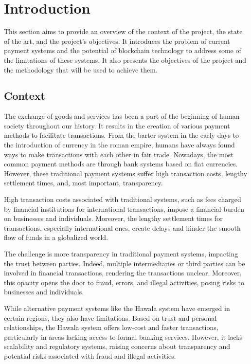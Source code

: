 \chapter{Introduction}
\label{ch:introduction}

This section aims to provide an overview of the context of the project, the state of the art, and the project's objectives. It introduces the
problem of current payment systems and the potential of blockchain technology to address some of the limitations of these systems. It also presents the
objectives of the project and the methodology that will be used to achieve them.

\minitoc



\section{Context}
\label{sec:ch1_context}

The exchange of goods and services has been a part of the beginning of human society throughout our history. It results in the creation of various payment methods
to facilitate transactions. From the barter system in the early days to the introduction of currency in the roman empire, humans
have always found ways to make transactions with each other in fair trade.
Nowadays, the most common payment methods are through bank systems based on fiat currencies. However, these traditional payment systems
suffer high transaction costs, lengthy settlement times, and, most important, transparency.


High transaction costs associated with traditional systems, such as fees charged by financial institutions for international transactions,
impose a financial burden on businesses and individuals. Moreover, the lengthy settlement times for
transactions, especially international ones, create delays and hinder the smooth flow of funds in a globalized world.


The challenge is more transparency in traditional payment systems, impacting the trust between parties. Indeed,
multiple intermediaries or third parties can be involved in financial transactions, rendering the transactions unclear. Moreover, this opacity opens
the door to fraud, errors, and illegal activities, posing risks to businesses and individuals.

While alternative payment systems like the Hawala system have emerged in certain regions, they also have limitations. Based on trust and personal relationships, the Hawala system offers low-cost and faster transactions, particularly in areas lacking access to formal banking services. However, it lacks scalability and regulatory systems, raising concerns about transparency and potential risks associated with fraud and illegal activities.

